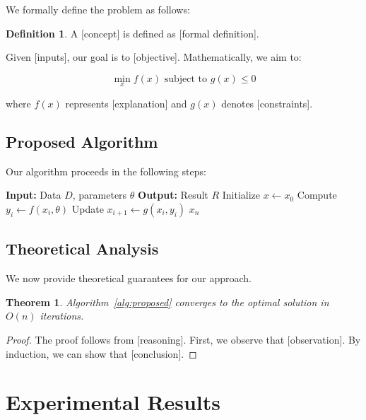 \documentclass[twocolumn]{article}
\newtheorem{theorem}{Theorem}
\theoremstyle{definition}
\newtheorem{definition}{Definition}
\theoremstyle{remark}
\begin{document}
We formally define the problem as follows:

\begin{definition}
\label{def:problem}
A [concept] is defined as [formal definition].
\end{definition}

Given [inputs], our goal is to [objective]. Mathematically, we aim to:

\begin{equation}
\label{eq:objective}
\min_{x} f(x) \text{ subject to } g(x) \leq 0
\end{equation}

where $f(x)$ represents [explanation] and $g(x)$ denotes [constraints].

\subsection{Proposed Algorithm}

Our algorithm proceeds in the following steps:

\begin{algorithm}[H]
\caption{Proposed Algorithm}
\label{alg:proposed}
\begin{algorithmic}[1]
\State \textbf{Input:} Data $D$, parameters $\theta$
\State \textbf{Output:} Result $R$
\State Initialize $x \leftarrow x_0$
    \State Compute $y_i \leftarrow f(x_i, \theta)$
    \State Update $x_{i+1} \leftarrow g(x_i, y_i)$
\EndFor
\State \Return $x_n$
\end{algorithmic}
\end{algorithm}

\subsection{Theoretical Analysis}

We now provide theoretical guarantees for our approach.

\begin{theorem}
\label{thm:convergence}
Algorithm~\ref{alg:proposed} converges to the optimal solution in $O(n)$ iterations.
\end{theorem}

\begin{proof}
The proof follows from [reasoning]. First, we observe that [observation]. 
By induction, we can show that [conclusion].
\end{proof}

\section{Experimental Results}
\label{sec:results}
\end{document}
